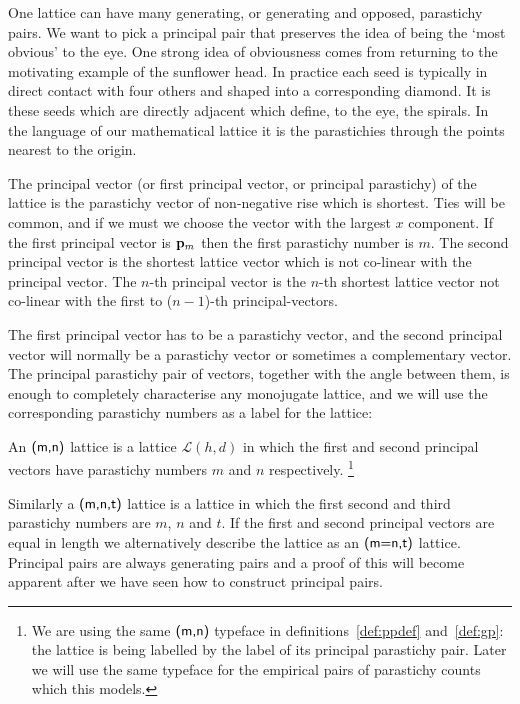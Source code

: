 \label{sec:ppair}
One lattice can have many generating, or generating and opposed, parastichy pairs.  We want to pick a principal pair that preserves the idea of being the `most obvious' to the eye. 
One strong idea of obviousness comes from returning to the motivating example of the sunflower head. In practice each seed is typically in direct contact with four others and shaped into a corresponding diamond. It is these seeds which are directly adjacent which define, to the eye, the spirals. 
In the language of our mathematical lattice it is the parastichies through the points nearest to the origin.
\begin{definition}
	The principal vector (or first principal vector, or principal parastichy) of the lattice is the parastichy vector of non-negative rise which is shortest. Ties will be common, and if we must we choose the vector with the largest $x$ component.
	If the first principal vector is ${\mathbf p}_{m}$ then the first parastichy number is $m$.  The second principal vector  is the shortest lattice vector which is not co-linear with the principal vector. The $n$-th principal vector is the $n$-th  shortest lattice vector not co-linear with the first to ($n-1$)-th principal-vectors.%
	
\end{definition}
The first principal vector has to be a parastichy vector, and the second principal vector will normally be a parastichy vector or sometimes a complementary vector.
The principal parastichy pair of vectors, together with the angle between them, is enough to completely characterise any monojugate lattice, and we will use the corresponding parastichy numbers as a label for the lattice:
\begin{definition}\label{def:ppdef}
	An  $\textsf{(m,n)}$ lattice is a lattice $\mathcal{L}(h,d)$ in which the first and second principal vectors have parastichy numbers $m$ and $n$ respectively. 
	\footnote{We are using the same $\textsf{(m,n)}$ typeface in definitions~\ref{def:ppdef} and~\ref{def:gp}: the lattice is being labelled by the label of its principal parastichy pair. Later we will use the same typeface for the empirical pairs of parastichy  counts which this models.}
\end{definition}
Similarly a  $\textsf{(m,n,t)}$ lattice is a lattice  in which the first  second  and third parastichy numbers are $m$, $n$ and $t$. If the first and second principal  vectors are equal in length we alternatively describe the lattice as an $\textsf{(m=n,t)}$ lattice.
Principal pairs are always generating pairs and a proof of this will become apparent after we have seen how to construct principal pairs. 


